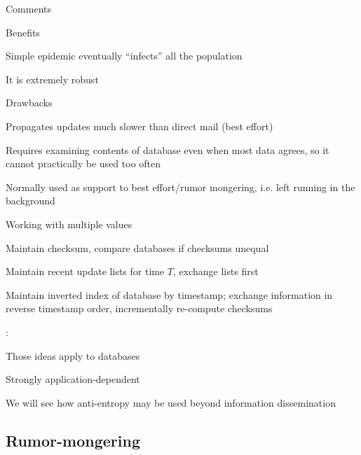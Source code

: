 \begin{frame}{Comments}
	
\begin{block}{Benefits}
\BI
\item Simple epidemic eventually “infects” all the population
\item It is extremely robust
\EI
\end{block}

\bigskip
\begin{block}{Drawbacks}
\BI
\item Propagates updates much slower than direct mail (best effort)
\item Requires examining contents of database even when most data agrees, so it cannot practically be used too often
\item Normally used as support to best effort/rumor mongering, i.e. left running in the background
\EI
\end{block}

\end{frame}

\begin{frame}{Working with multiple values}
	
	
\BIL
\item Maintain checksum, compare databases if checksums unequal
\item Maintain recent update lists for time $T$, exchange lists first
\item Maintain inverted index of database by timestamp; exchange information in reverse timestamp order, incrementally re-compute checksums
\EIL

\smallskip
{}:

\BIL
\item Those ideas apply to databases
\item Strongly application-dependent
\item We will see how anti-entropy may be used beyond information dissemination
\EIL

\end{frame}

\subsection{Rumor-mongering}

